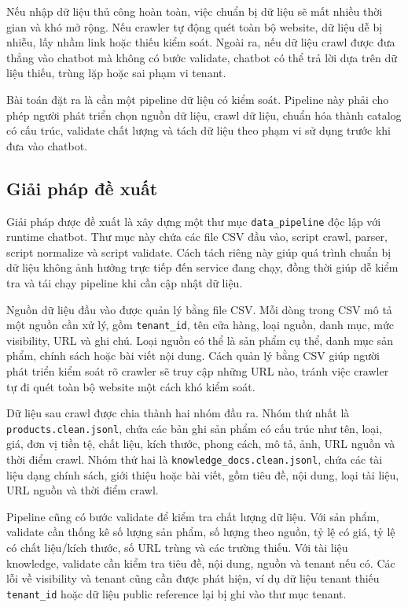 \documentclass[../DoAn.tex]{subfiles}
\begin{document}
Nếu nhập dữ liệu thủ công hoàn toàn, việc chuẩn bị dữ liệu sẽ mất nhiều thời gian và khó mở rộng. Nếu crawler tự động quét toàn bộ website, dữ liệu dễ bị nhiễu, lấy nhầm link hoặc thiếu kiểm soát. Ngoài ra, nếu dữ liệu crawl được đưa thẳng vào chatbot mà không có bước validate, chatbot có thể trả lời dựa trên dữ liệu thiếu, trùng lặp hoặc sai phạm vi tenant.

Bài toán đặt ra là cần một pipeline dữ liệu có kiểm soát. Pipeline này phải cho phép người phát triển chọn nguồn dữ liệu, crawl dữ liệu, chuẩn hóa thành catalog có cấu trúc, validate chất lượng và tách dữ liệu theo phạm vi sử dụng trước khi đưa vào chatbot.

\subsection{Giải pháp đề xuất}
\label{subsection:5.4.2}

Giải pháp được đề xuất là xây dựng một thư mục \texttt{data\_pipeline} độc lập với runtime chatbot. Thư mục này chứa các file CSV đầu vào, script crawl, parser, script normalize và script validate. Cách tách riêng này giúp quá trình chuẩn bị dữ liệu không ảnh hưởng trực tiếp đến service đang chạy, đồng thời giúp dễ kiểm tra và tái chạy pipeline khi cần cập nhật dữ liệu.

Nguồn dữ liệu đầu vào được quản lý bằng file CSV. Mỗi dòng trong CSV mô tả một nguồn cần xử lý, gồm \texttt{tenant\_id}, tên cửa hàng, loại nguồn, danh mục, mức visibility, URL và ghi chú. Loại nguồn có thể là sản phẩm cụ thể, danh mục sản phẩm, chính sách hoặc bài viết nội dung. Cách quản lý bằng CSV giúp người phát triển kiểm soát rõ crawler sẽ truy cập những URL nào, tránh việc crawler tự đi quét toàn bộ website một cách khó kiểm soát.

Dữ liệu sau crawl được chia thành hai nhóm đầu ra. Nhóm thứ nhất là \texttt{products.clean.jsonl}, chứa các bản ghi sản phẩm có cấu trúc như tên, loại, giá, đơn vị tiền tệ, chất liệu, kích thước, phong cách, mô tả, ảnh, URL nguồn và thời điểm crawl. Nhóm thứ hai là \texttt{knowledge\_docs.clean.jsonl}, chứa các tài liệu dạng chính sách, giới thiệu hoặc bài viết, gồm tiêu đề, nội dung, loại tài liệu, URL nguồn và thời điểm crawl.

Pipeline cũng có bước validate để kiểm tra chất lượng dữ liệu. Với sản phẩm, validate cần thống kê số lượng sản phẩm, số lượng theo nguồn, tỷ lệ có giá, tỷ lệ có chất liệu/kích thước, số URL trùng và các trường thiếu. Với tài liệu knowledge, validate cần kiểm tra tiêu đề, nội dung, nguồn và tenant nếu có. Các lỗi về visibility và tenant cũng cần được phát hiện, ví dụ dữ liệu tenant thiếu \texttt{tenant\_id} hoặc dữ liệu public reference lại bị ghi vào thư mục tenant.
\end{document}
